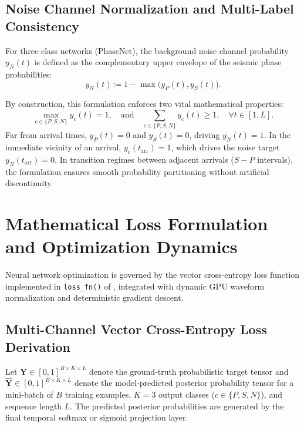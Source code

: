 \subsection{Noise Channel Normalization and Multi-Label Consistency}
\label{subsec:noise_channel_norm}

For three-class networks (\ac{PhaseNet}), the background noise
channel probability
$y_N(t)$ is defined as the complementary upper envelope of the seismic phase
probabilities:
\begin{equation}
  y_N(t) \coloneqq 1 - \max\bigl( y_P(t), y_S(t) \bigr).
  \label{eq:noise_channel_complement}
\end{equation}

By construction, this formulation enforces two vital mathematical properties:
\begin{equation}
  \max_{c \in \{P, S, N\}} y_c(t) = 1, \quad \text{and} \quad
  \sum_{c \in \{P, S, N\}} y_c(t) \ge 1, \quad \forall t \in [1, L].
  \label{eq:label_convexity}
\end{equation}
Far from arrival times, $y_P(t) = 0$ and $y_S(t) = 0$, driving $y_N(t) = 1$.
In the immediate vicinity of an arrival, $y_c(t_{\mathrm{arr}}) =
1$, which drives
the noise target $y_N(t_{\mathrm{arr}}) = 0$. In transition regimes between
adjacent arrivals ($S - P$ intervals), the formulation ensures
smooth probability
partitioning without artificial discontinuity.

\section{Mathematical Loss Formulation and Optimization Dynamics}
\label{sec:loss_and_optimization}

Neural network optimization is governed by the vector cross-entropy
loss function
implemented in \texttt{loss\_fn()} of , integrated
with dynamic \ac{GPU} waveform normalization and deterministic
gradient descent.

\subsection{Multi-Channel Vector Cross-Entropy Loss Derivation}
\label{subsec:loss_derivation}

Let $\mathbf{Y} \in [0, 1]^{B \times K \times L}$ denote the
ground-truth probabilistic
target tensor and $\hat{\mathbf{Y}} \in [0, 1]^{B \times K \times
L}$ denote the
model-predicted posterior probability tensor for a mini-batch of $B$ training
examples, $K = \num{3}$ output classes ($c \in \{P, S, N\}$), and sequence
length $L$.
The predicted posterior probabilities are generated by the final
temporal softmax
or sigmoid projection layer.

